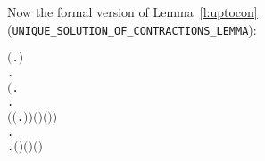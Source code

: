 Now the formal version of Lemma~\ref{l:uptocon} (\texttt{UNIQUE_SOLUTION_OF_CONTRACTIONS_LEMMA}):
\begin{alltt}
\HOLTokenTurnstile{} \ensuremath{(}\HOLSymConst{\HOLTokenExists{}}.   \HOLSymConst{\HOLTokenConj{}}  \HOLSymConst{\HOLTokenContracts{}}   \HOLSymConst{\HOLTokenConj{}}  \HOLSymConst{\HOLTokenContracts{}}  \ensuremath{)} \HOLSymConst{\HOLTokenImp{}}
   \HOLSymConst{\HOLTokenForall{}}.
         \HOLSymConst{\HOLTokenImp{}}
       \ensuremath{(}\HOLSymConst{\HOLTokenForall{}} .
              \HOLTokenWeakTransBegin{} \HOLTokenWeakTransEnd {} \HOLSymConst{\HOLTokenImp{}}
            \HOLSymConst{\HOLTokenExists{}}.
                  \HOLSymConst{\HOLTokenConj{}}  \HOLSymConst{\HOLTokenContracts{}}   \HOLSymConst{\HOLTokenConj{}}
                \ensuremath{(} \HOLSymConst{\HOLTokenRCompose{}} \ensuremath{(}\HOLTokenLambda{} .  \HOLTokenWeakTransBegin{} \HOLTokenWeakTransEnd {}\ensuremath{)}\ensuremath{)} \ensuremath{(} \ensuremath{)} \ensuremath{(} \ensuremath{)}\ensuremath{)} \HOLSymConst{\HOLTokenConj{}}
       \HOLSymConst{\HOLTokenForall{}}.
             \HOLTokenWeakTransBegin\HOLSymConst{\ensuremath{\tau}}\HOLTokenWeakTransEnd {} \HOLSymConst{\HOLTokenImp{}}
           \HOLSymConst{\HOLTokenExists{}}.   \HOLSymConst{\HOLTokenConj{}}  \HOLSymConst{\HOLTokenContracts{}}   \HOLSymConst{\HOLTokenConj{}} \ensuremath{(} \HOLSymConst{\HOLTokenRCompose{}} \ensuremath{)} \ensuremath{(} \ensuremath{)} \ensuremath{(} \ensuremath{)}
\end{alltt}

